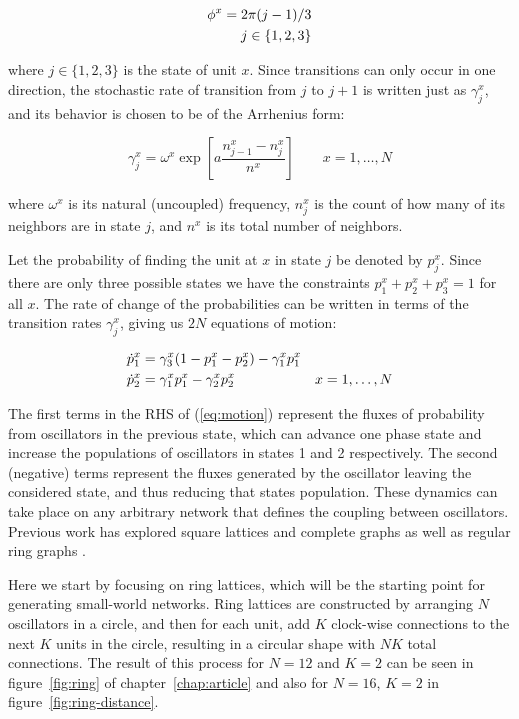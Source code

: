 \begin{align}
    \phi^x = 2\pi (j-1)/3 \\
    j \in \{1,2,3\} \notag
\end{align}

\noindent where $j\in\{1,2,3\}$ is the state of unit $x$. Since transitions can only occur in one direction, the stochastic rate of
transition from $j$ to $j+1$ is written just as $\gamma^x_j$, and its behavior is chosen to be of the Arrhenius form:

\begin{equation}
    \gamma^x_j = \omega^x\exp\left[ a\frac{n^x_{j-1} - n^x_j}{n^x} \right] \qquad x=1,\dots, N
    \label{rate}
\end{equation}

\noindent where $\omega^x$ is its natural (uncoupled) frequency, $n^x_j$ is the count of how many of its neighbors are in state $j$,
and $n^x$ is its total number of neighbors.

Let the probability of finding the unit at $x$ in state $j$ be denoted by $p^x_j$. Since there are only three possible states we have
the constraints $p^x_1+p^x_2+p^x_3=1$ for all $x$. The rate of change of the probabilities can be written in terms of the transition
rates $\gamma^x_j$, giving us $2N$ equations of motion:

\begin{align}
    \dot{p}^x_1 &= \gamma^x_3(1 - p^x_1 - p^x_2) - \gamma^x_1 p^x_1 & \notag\\
    \dot{p}^x_2 &= \gamma^x_1p^x_1 - \gamma^x_2 p^x_2 &x=1,\dots,N
    \label{eq:motion}
\end{align}

\noindent The first terms in the RHS of (\ref{eq:motion}) represent the fluxes of probability from oscillators in the previous state,
which can advance one phase state and increase the populations of oscillators in states 1 and 2 respectively. The second (negative)
terms represent the fluxes generated by the oscillator leaving the considered state, and thus reducing that states population. These
dynamics can take place on any arbitrary network that defines the coupling between oscillators. Previous work has explored square
lattices and complete graphs as well as regular ring graphs \cite{Wood06a,assis2011infinite,escaff2014arrays}.

Here we start by focusing on ring lattices, which will be the starting point for generating small-world networks. Ring lattices are
constructed by arranging $N$ oscillators in a circle, and then for each unit, add $K$ clock-wise connections to the next $K$ units in
the circle, resulting in a circular shape with $NK$ total connections. The result of this process for $N=12$ and $K=2$ can be seen in
figure~\ref{fig:ring} of chapter~\ref{chap:article} and also for $N=16$, $K=2$ in figure~\ref{fig:ring-distance}.

